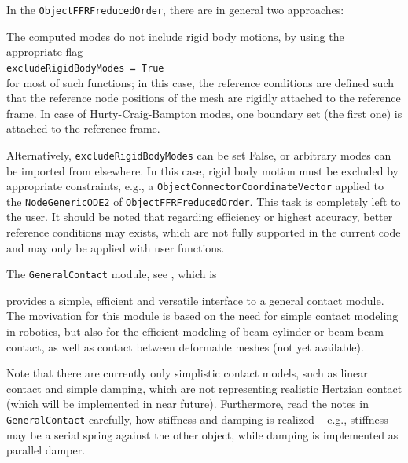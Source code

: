 In the \texttt{ObjectFFRFreducedOrder}, there are in general two approaches:
\bi
  \item The computed modes do not include rigid body motions, by using the appropriate flag\\ \texttt{excludeRigidBodyModes = True}\\ for most of such functions; in this case, the reference conditions are defined such that the reference node positions of the mesh are rigidly attached to the reference frame. In case of Hurty-Craig-Bampton modes, one boundary set (the first one) is attached to the reference frame.
  \item Alternatively, \texttt{excludeRigidBodyModes} can be set False, or arbitrary modes can be imported from elsewhere.
    In this case, rigid body motion must be excluded by appropriate constraints, e.g., a \texttt{ObjectConnectorCoordinateVector} applied to the \texttt{NodeGenericODE2} of \texttt{ObjectFFRFreducedOrder}. This task is completely left to the user.
\ei
It should be noted that regarding efficiency or highest accuracy, better reference conditions may exists, which are not fully supported in the current code and may only be applied with user functions.





















\clearpage
% 
The \texttt{GeneralContact} module, see ,  which is 
\bi
  \item[] 
\ei
provides a simple, efficient and versatile interface to a general contact module. The movivation for this module is based on the need for simple contact modeling in robotics, but also for the efficient modeling of beam-cylinder or beam-beam contact, as well as contact between deformable meshes (not yet available).

Note that there are currently only simplistic contact models, such as linear contact and simple damping, which are not representing realistic Hertzian contact (which will be implemented in near future). Furthermore, read the notes in \texttt{GeneralContact} carefully, how stiffness and damping is realized -- e.g., stiffness may be a serial spring against the other object, while damping is implemented as parallel damper.

